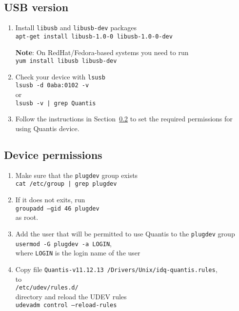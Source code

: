 \documentclass[a4paper,11pt]{article}
\providecommand{\note}[1]{\vspace{6pt}\noindent\textbf{Note}: #1\vspace{6pt}}
\newcommand{\QuantisDistVersion}{Quantis-v11.12.13}
\begin{document}
\subsection{USB version}\label{sec:usb-version}
\begin{enumerate}
    \item Install \texttt{libusb} and \texttt{libusb-dev} packages\\ 
    \texttt{apt-get install libusb-1.0-0 libusb-1.0-0-dev}

    \note{On RedHat/Fedora-based systems you need to run}\\
    \texttt{yum install libusb libusb-dev}

    \item Check your device with \texttt{lsusb}\\
    \texttt{lsusb -d 0aba:0102 -v}\\ or\\ \texttt{lsusb -v | grep Quantis}

    \item Follow the instructions in Section~\ref{sec:permissions} to set the
    required permissions for using Quantis device.

\end{enumerate}


\subsection{Device permissions}\label{sec:permissions}
\begin{enumerate}
    \item Make sure that the \texttt{plugdev} group exists\\
    \texttt{cat /etc/group | grep plugdev}
    \item If it does not exits, run\\ 
    \texttt{groupadd --gid 46 plugdev}\\
    as root.
    \item Add the user that will be permitted to use Quantis to the
    \texttt{plugdev} group\\ \texttt{usermod -G plugdev -a LOGIN},\\ where
    \texttt{LOGIN} is the login name of the user
    \item Copy file \texttt{\QuantisDistVersion
    /Drivers/Unix/idq-quantis.rules},\\ to\\ \texttt{/etc/udev/rules.d/}\\ directory
    and reload the UDEV rules\\ \texttt{udevadm control --reload-rules}
\end{enumerate}
\end{document}
